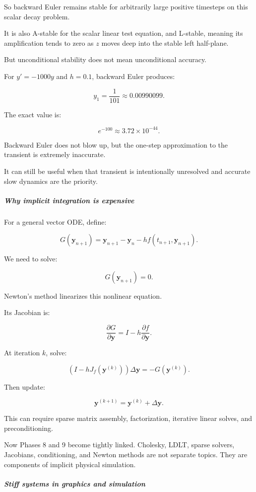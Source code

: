 So backward Euler remains stable for arbitrarily large positive timesteps on this scalar decay problem.

It is also A-stable for the scalar linear test equation, and L-stable, meaning its amplification tends to zero as \(z\) moves deep into the stable left half-plane.

But unconditional stability does not mean unconditional accuracy.

For \(y'=-1000y\) and \(h=0.1\), backward Euler produces:

\[
y_1=\frac1{101}\approx0.00990099.
\]

The exact value is:

\[
e^{-100}\approx3.72\times10^{-44}.
\]

Backward Euler does not blow up, but the one-step approximation to the transient is extremely inaccurate.

It can still be useful when that transient is intentionally unresolved and accurate slow dynamics are the priority.

\subparagraph{Why implicit integration is expensive}\label{02-foundations-ii-ch025-why-implicit-integration-is-expensive}

For a general vector ODE, define:

\[
G(\mathbf y_{n+1}) = \mathbf y_{n+1}-\mathbf y_n -hf(t_{n+1},\mathbf y_{n+1}).
\]

We need to solve:

\[
G(\mathbf y_{n+1})=0.
\]

Newton's method linearizes this nonlinear equation.

Its Jacobian is:

\[
\frac{\partial G}{\partial\mathbf y} = I-h\frac{\partial f}{\partial\mathbf y}.
\]

At iteration \(k\), solve:

\[
\boxed{ \left(I-hJ_f(\mathbf y^{(k)})\right)\Delta\mathbf y = -G(\mathbf y^{(k)}) }.
\]

Then update:

\[
\mathbf y^{(k+1)}=\mathbf y^{(k)}+\Delta\mathbf y.
\]

This can require sparse matrix assembly, factorization, iterative linear solves, and preconditioning.

Now Phases 8 and 9 become tightly linked. Cholesky, LDLT, sparse solvers, Jacobians, conditioning, and Newton methods are not separate topics. They are components of implicit physical simulation.

\subparagraph{Stiff systems in graphics and simulation}\label{02-foundations-ii-ch025-stiff-systems-in-graphics-and-simulation}

